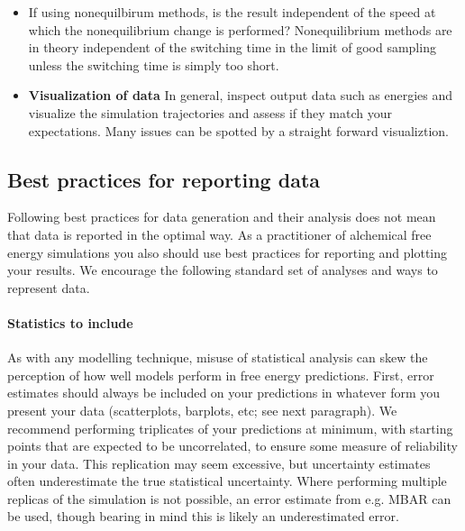 \documentclass[9pt,bestpractices]{livecoms}
\begin{document}
\begin{itemize}
\item If using nonequilbirum methods, is the result independent of the speed at which the nonequilibrium change is performed? Nonequilibrium methods are in theory independent of the switching time in the limit of good sampling unless the switching time is simply too short. 
\item \textbf{Visualization of data} In general, inspect output data such as energies and visualize the simulation trajectories and assess if they match your expectations. Many issues can be spotted by a straight forward visualiztion. 
\end{itemize}


\subsection{Best practices for reporting data }
\label{sec:plot_data}
Following best practices for data generation and their analysis does not mean that data is reported in the optimal way. As a practitioner of alchemical free energy simulations you also should use best practices for reporting and plotting your results. We encourage the following standard set of analyses and ways to represent data. 
\paragraph{Statistics to include}
As with any modelling technique, misuse of statistical analysis can skew the perception of how well models perform in free energy predictions. First, error estimates should always be included on your predictions in whatever form you present your data (scatterplots, barplots, etc; see next paragraph). We recommend performing triplicates of your predictions at minimum, with starting points that are expected to be uncorrelated, to ensure some measure of reliability in your data. This replication may seem excessive, but uncertainty estimates often underestimate the true statistical uncertainty. Where performing multiple replicas of the simulation is not possible, an error estimate from e.g. MBAR can be used, though bearing in mind this is likely an underestimated error. 
\end{document}

